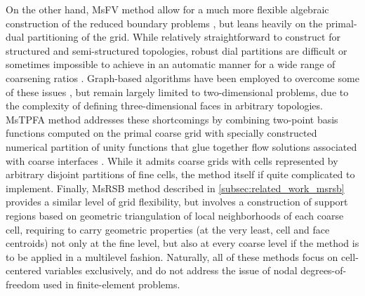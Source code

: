 On the other hand, MsFV method allow for a much more flexible algebraic construction of the reduced boundary problems \cite{Wang2014}, but leans heavily on the primal-dual partitioning of the grid.   While relatively straightforward to construct for structured and semi-structured topologies, robust dial partitions are difficult or sometimes impossible to achieve in an automatic manner for a wide range of coarsening ratios \cite{Moyner2014a}.   Graph-based algorithms have been employed to overcome some of these issues \cite{Mehrdoost2019}, but remain largely limited to two-dimensional problems, due to the complexity of defining three-dimensional faces in arbitrary topologies.   MsTPFA method addresses these shortcomings by combining two-point basis functions computed on the primal coarse grid with specially constructed numerical partition of unity functions that glue together flow solutions associated with coarse interfaces \cite{Moyner2014}.   While it admits coarse grids with cells represented by arbitrary disjoint partitions of fine cells, the method itself if quite complicated to implement.   Finally, MsRSB method described in \autoref{subsec:related_work_msrsb} provides a similar level of grid flexibility, but involves a construction of support regions based on geometric triangulation of local neighborhoods of each coarse cell, requiring to carry geometric properties (at the very least, cell and face centroids) not only at the fine level, but also at every coarse level if the method is to be applied in a multilevel fashion.   Naturally, all of these methods focus on cell-centered variables exclusively, and do not address the issue of nodal degrees-of-freedom used in finite-element problems.

